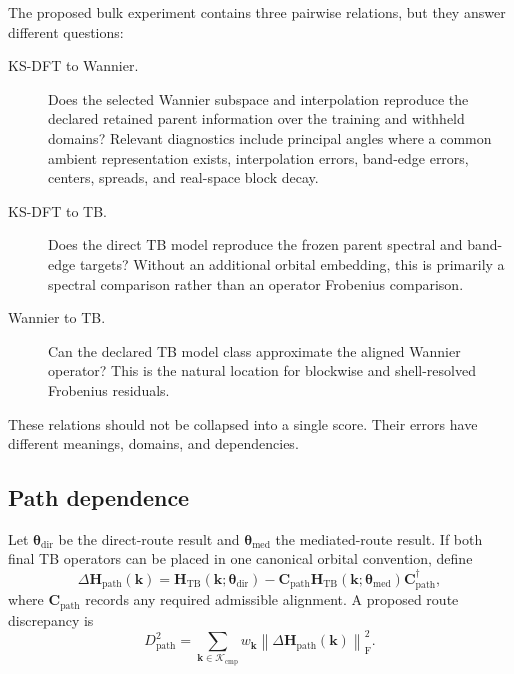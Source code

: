 The proposed bulk experiment contains three pairwise relations, but they answer
different questions:
\begin{description}
    \item[KS-DFT to Wannier.] Does the selected Wannier subspace and
      interpolation reproduce the declared retained parent information over
      the training and withheld domains? Relevant diagnostics include
      principal angles where a common ambient representation exists,
      interpolation errors, band-edge errors, centers, spreads, and real-space
      block decay.
    \item[KS-DFT to TB.] Does the direct TB model reproduce the frozen parent
      spectral and band-edge targets? Without an additional orbital embedding,
      this is primarily a spectral comparison rather than an operator
      Frobenius comparison.
    \item[Wannier to TB.] Can the declared TB model class approximate the
      aligned Wannier operator? This is the natural location for blockwise and
      shell-resolved Frobenius residuals.
\end{description}
These relations should not be collapsed into a single score. Their errors have
different meanings, domains, and dependencies.

\subsection{Path dependence}


Let $\boldsymbol\theta_{\mathrm{dir}}$ be the direct-route result and
$\boldsymbol\theta_{\mathrm{med}}$ the mediated-route result. If both final TB
operators can be placed in one canonical orbital convention, define
\begin{equation}
    \Delta\mathbf H_{\mathrm{path}}(\mathbf k)
    =
    \mathbf H_{\mathrm{TB}}
    (\mathbf k;\boldsymbol\theta_{\mathrm{dir}})
    -
    \mathbf C_{\mathrm{path}}
    \mathbf H_{\mathrm{TB}}
    (\mathbf k;\boldsymbol\theta_{\mathrm{med}})
    \mathbf C_{\mathrm{path}}^\dagger,
\end{equation}
where $\mathbf C_{\mathrm{path}}$ records any required admissible alignment.
A proposed route discrepancy is
\begin{equation}
    D_{\mathrm{path}}^2
    =
    \sum_{\mathbf k\in\mathcal K_{\mathrm{cmp}}}
    w_{\mathbf k}
    \left\lVert
        \Delta\mathbf H_{\mathrm{path}}(\mathbf k)
    \right\rVert_{\mathrm F}^2.
\end{equation}

